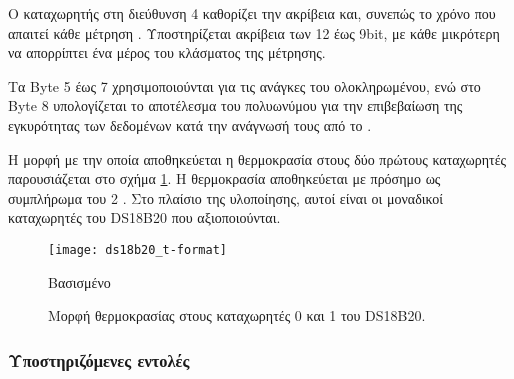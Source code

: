 Ο καταχωρητής στη διεύθυνση 4 καθορίζει την ακρίβεια και, συνεπώς το χρόνο που
απαιτεί κάθε μέτρηση \parencite[4,8]{ds18b20}. Υποστηρίζεται ακρίβεια των 12 έως
9bit, με κάθε μικρότερη να απορρίπτει ένα μέρος του κλάσματος της μέτρησης.

Τα Byte 5 έως 7 χρησιμοποιούνται για τις ανάγκες του ολοκληρωμένου, ενώ στο Byte
8 υπολογίζεται το αποτέλεσμα του πολυωνύμου για την επιβεβαίωση της εγκυρότητας
των δεδομένων κατά την ανάγνωσή τους από το .

Η μορφή με την οποία αποθηκεύεται η θερμοκρασία στους δύο πρώτους καταχωρητές
παρουσιάζεται στο σχήμα \ref{fig:ds18b20:t-format}. Η θερμοκρασία αποθηκεύεται
με πρόσημο ως συμπλήρωμα του 2 \parencite[3]{ds18b20}. Στο πλαίσιο της
υλοποίησης, αυτοί είναι οι μοναδικοί καταχωρητές του DS18B20 που αξιοποιούνται.

\begin{figure}
    \caption{Μορφή θερμοκρασίας στους καταχωρητές 0 και 1 του DS18B20.
    \label{fig:ds18b20:t-format}}
    \begin{center}
    \texttt{[image: ds18b20\_t-format]}
    \end{center}
    Βασισμένο 
\end{figure}

\subsubsection{Υποστηριζόμενες εντολές}
\label{ssubsec:ds18b20:commands}

